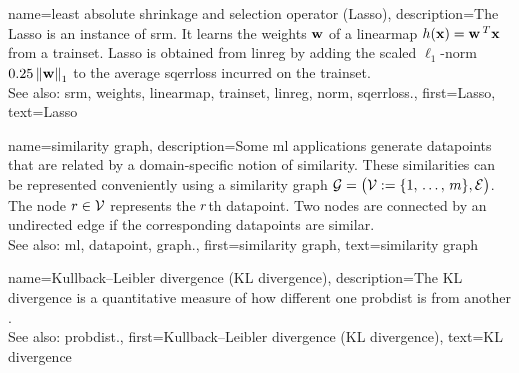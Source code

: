  
 {name={least absolute shrinkage and selection operator (Lasso)}, 
	description={The Lasso is an 
		instance of \gls{srm}. It learns the \gls{weights} ${\bf w}$ of a \gls{linearmap} 
		$h({\bf x}) = {\bf w}\,^{T} {\bf x}$ from a \gls{trainset}. 
		Lasso is obtained from \gls{linreg} by adding the scaled $\ell_{1}$-\gls{norm} 
		$0.25 \left\Vert {{\bf w}} \right\Vert_{1}$ to the average \gls{sqerrloss} incurred on the \gls{trainset}. 
				\\
		See also: \gls{srm}, \gls{weights}, \gls{linearmap}, \gls{trainset}, \gls{linreg}, \gls{norm}, \gls{sqerrloss}.},
	first={Lasso},
	text={Lasso} 
}
 
 {name={similarity graph}, 
 	description={Some \gls{ml} applications generate \glspl{datapoint} that 
 		are related by a domain-specific notion of similarity. These similarities can be 
 		represented conveniently using a similarity \gls{graph} $\mathcal{G} = \big(\mathcal{V} := \{1, \,\ldots, \,m\}, \mathcal{E}\big)$. 
 		The node $r \in \mathcal{V}$ represents the $r$th \gls{datapoint}. Two 
 		nodes are connected by an undirected edge if the corresponding \glspl{datapoint} are similar. 
				\\
		See also: \gls{ml}, \gls{datapoint}, \gls{graph}.},
 	first={similarity graph},
	text={similarity graph} 
}
 
 
 {name={Kullback–Leibler divergence (KL divergence)}, 
 	description={The KL divergence is a quantitative 
 		 measure of how different one \gls{probdist} is from another \cite{coverthomas}.  
		 		\\
		See also: \gls{probdist}.},
 	first={Kullback–Leibler divergence (KL divergence)},
	text={KL divergence} 
}

